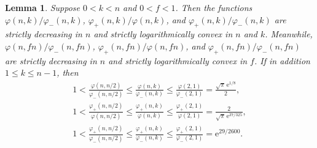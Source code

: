 \documentclass[aop]{imsart}
\theoremstyle{plain}
\newtheorem{lemma}[theorem]{Lemma}
\theoremstyle{remark}
\newcommand{\rme}{\mathrm{e}}
\newcommand{\1}{\operatorname{\uppercase\expandafter{\romannumeral1}}}
\newcommand{\2}{\operatorname{\uppercase\expandafter{\romannumeral2}}}
\newcommand{\3}{\operatorname{\uppercase\expandafter{\romannumeral3}}}
\newcommand{\4}{\operatorname{\uppercase\expandafter{\romannumeral4}}}
\newcommand{\5}{\operatorname{\uppercase\expandafter{\romannumeral5}}}
\newcommand{\6}{\operatorname{\uppercase\expandafter{\romannumeral6}}}
\newcommand{\7}{\operatorname{\uppercase\expandafter{\romannumeral7}}}
\newcommand{\8}{\operatorname{\uppercase\expandafter{\romannumeral8}}}
\newcommand{\9}{\operatorname{\uppercase\expandafter{\romannumeral9}}}
\begin{document}
\begin{lemma}\label{lem:varphipm}
	Suppose $0<k<n$ and $0<f<1$. Then the  functions $\varphi(n,k)/\varphi_-(n,k)$,
	$\varphi_+(n,k)/\varphi(n,k)$, and $\varphi_+(n,k)/\varphi_-(n,k)$	are strictly decreasing  in $n$ and strictly logarithmically convex in $n$ and $k$. Meanwhile, $\varphi(n,fn)/\varphi_-(n,fn)$,
	$\varphi_+(n,fn)/\varphi(n,fn)$, and $\varphi_+(n,fn)/\varphi_-(n,fn)$ 	are strictly decreasing in $n$ and strictly logarithmically convex in $f$. If in addition $1\leq k\leq n-1$, then
	\begin{gather}
	1< \frac{\varphi(n,n/2)}{\varphi_-(n,n/2)}\leq \frac{\varphi(n,k)}{\varphi_-(n,k)}\leq \frac{\varphi(2,1)}{\varphi_-(2,1)}= \frac{\sqrt{\pi}\,\rme^{1/8}}{2}, \label{eq:varphi/varphi-}\\
	1<
	\frac{\varphi_+(n,n/2)}{\varphi(n,n/2)}\leq \frac{\varphi_+(n,k)}{\varphi(n,k)}\leq \frac{\varphi_+(2,1)}{\varphi(2,1)}= \frac{2}{\sqrt{\pi}\,\rme^{37/325}}, \label{eq:varphi+/varphi}\\
	1< \frac{\varphi_+(n,n/2)}{\varphi_-(n,n/2)}\leq \frac{\varphi_+(n,k)}{\varphi_-(n,k)}\leq \frac{\varphi_+(2,1)}{\varphi_-(2,1)}= \rme^{29/2600}. \label{eq:varphi+/varphi-}
	\end{gather}	
\end{lemma}
\end{document}
